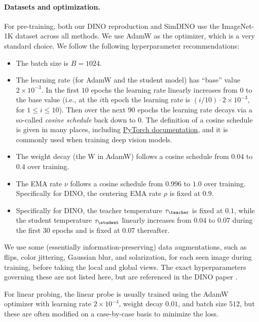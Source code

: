 \documentclass[../../book-main.tex]{subfiles}
\begin{document}
\paragraph{Datasets and optimization.} For pre-training, both our DINO reproduction and SimDINO use the ImageNet-1K dataset across all methods. We use AdamW \citep{Loshchilov2017DecoupledWD} as the optimizer, which is a very standard choice. We follow the following hyperparameter recommendations:
\begin{itemize}
    \item The batch size is \(B = 1024\).
    \item The learning rate (for AdamW and the student model) has ``base'' value \(2 \times 10^{-3}\). In the first \(10\) epochs the learning rate linearly increases from \(0\) to the base value (i.e., at the \(i\)th epoch the learning rate is \((i/10) \cdot 2 \times 10^{-3}\), for \(1 \leq i \leq 10\)). Then over the next \(90\) epochs the learning rate decays via a so-called \textit{cosine schedule} back down to \(0\). The definition of a cosine schedule is given in many places, including \href{https://pytorch.org/docs/stable/generated/torch.optim.lr_scheduler.CosineAnnealingLR.html}{PyTorch documentation}, and it is commonly used when training deep vision models.
    \item The weight decay (the W in AdamW) follows a cosine schedule from 0.04 to \(0.4\) over training.
    \item The EMA rate \(\nu\) follows a cosine schedule from \(0.996\) to \(1.0\) over training. Specifically for DINO, the centering EMA rate \(\rho\) is fixed at \(0.9\).
    \item Specifically for DINO, the teacher temperature \(\tau_{\teacher}\) is fixed at \(0.1\), while the student temperature \(\tau_{\student}\) linearly increases from \(0.04\) to \(0.07\) during the first \(30\) epochs and is fixed at \(0.07\) thereafter.
\end{itemize}
We use some (essentially information-preserving) data augmentations, such as flips, color jittering, Gaussian blur, and solarization, for each seen image during training, before taking the local and global views. The exact hyperparameters governing these are not listed here, but are referenced in the DINO paper \citep{caron2021emerging}.

For linear probing, the linear probe is usually trained using the AdamW optimizer with learning rate \(2 \times 10^{-4}\), weight decay \(0.01\), and batch size \(512\), but these are often modified on a case-by-case basis to minimize the loss.
\end{document}
